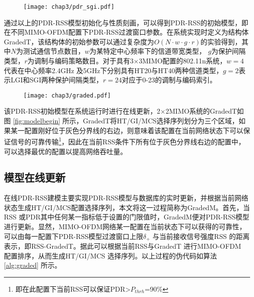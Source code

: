 \begin{figure}[!htp]
\centering
    \texttt{[image: chap3/pdr\_sgi.pdf]}
\end{figure}

通过以上的PDR-RSS模型初始化与性质刻画，可以得到PDR-RSS的初始模型，即在不同MIMO-OFDM配置下PDR-RSS过渡窗口参数。在系统实现时定义为结构体GradedT，该结构体的初始参数可以通过复杂度为$\textit{O}(N \cdot w \cdot g \cdot r)$的实验得到，其中$N$为测试通信节点数目，$w$为某特定中心频率下的信道带宽类型， $g$为保护间隔类型，$r$为调制与编码策略数目。对于具有3$\times$3MIMO配置的802.11n系统，$w=4$代表在中心频率2.4GHz 及5GHz下分别具有HT20与HT40两种信道类型，$g=2$表示LGI和SGI两种保护间隔类型，$r=24$对应于0-23的调制与编码索引。

\begin{figure}[!htp]
\centering
    \texttt{[image: chap3/graded.pdf]}
\end{figure}

该PDR-RSS初始模型在系统运行时进行在线更新，2$\times$2MIMO系统的GradedT如图 \ref{fig:modelbegin} 所示，GradedT将HT/GI/MCS选择序列划分为三个区域，如果某一配置刚好位于灰色分界线的右边，则意味着该配置在当前网络状态下可以保证信号的可靠传输\footnote{即在此配置下当前RSS可以保证PDR>$P_{thrh}$=90\%}，因此在当前RSS条件下所有位于灰色分界线右边的配置中，可以选择最优的配置以提高网络吞吐量。

\subsection{模型在线更新}
\label{sec:update}

在线PDR-RSS建模主要实现PDR-RSS模型与数据库的实时更新，并根据当前网络状态生成HT/GI/MCS配置选择序列，本文将这一过程简称为GradedM。首先，当RSS 或PDR其中任何某一指标低于设置的门限值时，GradedM便对PDR-RSS模型进行更新。显然，MIMO-OFDM网络某一配置在当前状态下可以获得的可靠性，可以由每一配置下PDR-RSS模型过渡窗口上限$\delta_+$ 与当前接收信号强度RSS 的距离表示，即RSS-GradedT。据此可以根据当前RSS与GradedT 进行MIMO-OFDM 配置排序，从而生成HT/GI/MCS 选择序列。以上过程的伪代码如算法 \ref{alg:graded} 所示。

